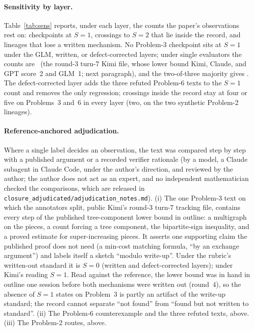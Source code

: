 \paragraph{Sensitivity by layer.} Table~\ref{tab:sens} reports, under each layer, the counts the paper's observations rest on: checkpoints at $S{=}1$, crossings to $S{=}2$ that lie inside the record, and lineages that lose a written mechanism. No Problem-3 checkpoint sits at $S{=}1$ under the GLM, written, or defect-corrected layers; under single evaluators the counts are \PTHREESONESINGLE\ (the round-3 turn-7 Kimi file, whose lower bound Kimi, Claude, and GPT score~2 and GLM~1; next paragraph), and the two-of-three majority gives \PTHREESONEMAJ. The defect-corrected layer adds the three refuted Problem-6 texts to the $S{=}1$ count and removes the only regression; crossings inside the record stay at four or five on Problems~3 and~6 in every layer (two, on the two synthetic Problem-2 lineages).
\begin{table}[htbp]
  \caption{Headline counts under each label layer. P2$^{\mathrm{s}}$: the two synthetic-route Problem-2 lineages only.}
  \label{tab:sens}
  \centering\scriptsize
  \SENSTABLE
\end{table}

\paragraph{Reference-anchored adjudication.} Where a single label decides an observation, the text was compared step by step with a published argument or a recorded verifier rationale (by a model, a Claude subagent in Claude Code, under the author's direction, and reviewed by the author; the author does not act as an expert, and no independent mathematician checked the comparisons, which are released in \texttt{closure\_adjudicated/\allowbreak adjudication\_notes.md}). (i) The one Problem-3 text on which the annotators split, public Kimi's round-3 turn-7 tracking file, contains every step of the published tree-component lower bound \citep{chen2026notes} in outline: a multigraph on the pieces, a count forcing a tree component, the bipartite-sign inequality, and a proved estimate for super-increasing pieces. It asserts one supporting claim the published proof does not need (a min-cost matching formula, ``by an exchange argument'') and labels itself a sketch ``modulo write-up''. Under the rubric's written-out standard it is $S{=}0$ (written and defect-corrected layers); under Kimi's reading $S{=}1$. Read against the reference, the lower bound was in hand in outline one session before both mechanisms were written out (round~4), so the absence of $S{=}1$ states on Problem~3 is partly an artifact of the write-up standard; the record cannot separate ``not found'' from ``found but not written to standard''. (ii) The Problem-6 counterexample and the three refuted texts, above. (iii) The Problem-2 routes, above.

